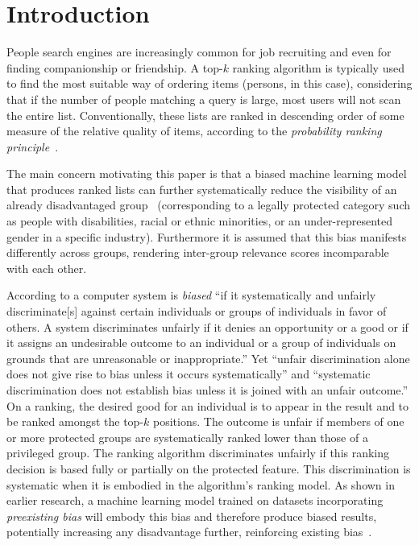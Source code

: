 \section{Introduction}\label{sec:introduction}

People search engines are increasingly common for job recruiting and even for finding companionship or friendship.
%
A top-$k$ ranking algorithm is typically used to find the most suitable way of ordering items (persons, in this case), considering that if the number of people matching a query is large, most users will not scan the entire list.
%
Conventionally, these lists are ranked in descending order of some measure of the relative quality of items, according to the \emph{probability ranking principle}~\cite{robertson1977probability}.

The main concern motivating this paper is that a biased machine learning model that produces ranked lists can further systematically reduce the visibility of an already disadvantaged group~\cite{peder2008,Dwork2012} (corresponding to a legally protected category such as people with disabilities, racial or ethnic minorities, or an under-represented gender in a specific industry).
%
Furthermore it is assumed that this bias manifests differently across groups, rendering inter-group relevance scores incomparable with each other.

According to \citet{friedman1996bias} a computer system is \emph{biased} ``if it systematically and unfairly discriminate[s] against certain individuals or groups of individuals in favor of others. 
%
A system discriminates unfairly if it denies an opportunity or a good or if it assigns an undesirable outcome to an individual or a group of individuals on grounds that are unreasonable or inappropriate.''
%
Yet ``unfair discrimination alone does not give rise to bias unless it occurs systematically'' and ``systematic discrimination does not establish bias unless it is joined with an unfair outcome.''
%
On a ranking, the desired good for an individual is to appear in the result and to be ranked amongst the top-$k$ positions. 
%
The outcome is unfair if members of one or more protected groups are systematically ranked lower than those of a privileged group.
%
The ranking algorithm discriminates unfairly if this ranking decision is based fully or partially on the protected feature. 
%
This discrimination is systematic when it is embodied in the algorithm's ranking model. 
%
As shown in earlier research, a machine learning model trained on datasets incorporating \textit{preexisting bias} will embody this bias and therefore produce biased results, potentially increasing any disadvantage further, reinforcing existing bias~\cite{oneil2016weapons}.

